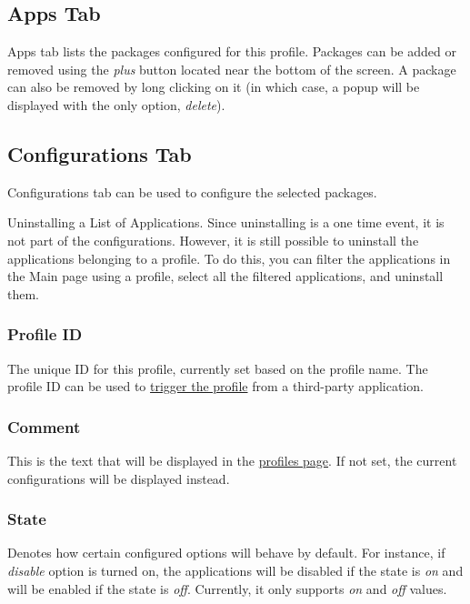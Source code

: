 \subsection{Apps Tab}\label{subsec:profile-apps-tab} %
Apps tab lists the packages configured for this profile. Packages can be added or removed using the
\textit{plus} button located near the bottom of the screen. A package can also be removed by long
clicking on it (in which case, a popup will be displayed with the only option, \textit{delete}).

\subsection{Configurations Tab}\label{subsec:profile-configurations-tab} %
Configurations tab can be used to configure the selected packages.

\begin{tip}{Uninstalling a List of Applications.}
    Since uninstalling is a one time event, it is not part of the configurations. However, it is
    still possible to uninstall the applications belonging to a profile. To do this, you can filter
    the applications in the Main page using a profile, select all the filtered applications, and
    uninstall them.
\end{tip}

\subsubsection{Profile ID} %
The unique ID for this profile, currently set based on the profile name. The profile ID can be used
to \hyperref[subsec:triggering-a-profile]{trigger the profile} from a third-party application.

\subsubsection{Comment} %
This is the text that will be displayed in the \hyperref[sec:profiles-page]{profiles page}. If not set, the current
configurations will be displayed instead.

\subsubsection{State}\label{subsubsec:profile-state} %
Denotes how certain configured options will behave by default. For instance, if \textit{disable} option is turned on,
the applications will be disabled if the state is \textit{on} and will be enabled if the state is \textit{off}.
Currently, it only supports \textit{on} and \textit{off} values.

